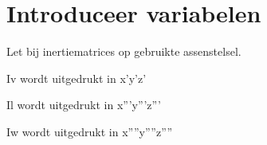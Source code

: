 \documentclass{article}
\begin{document}
\section{\textbf{Introduceer variabelen}}
\begin{maplelatex}\begin{Maple Normal}{
Let bij inertiematrices op gebruikte assenstelsel.}\end{Maple Normal}
\end{maplelatex}
\begin{maplelatex}\begin{Maple Normal}{
Iv wordt uitgedrukt in x'y'z'}\end{Maple Normal}
\end{maplelatex}
\begin{maplelatex}\begin{Maple Normal}{
Il wordt uitgedrukt in x'''y'''z'''}\end{Maple Normal}
\end{maplelatex}
\begin{maplelatex}\begin{Maple Normal}{
Iw wordt uitgedrukt in x''''y''''z''''}\end{Maple Normal}
\end{maplelatex}
\begin{maplelatex}\begin{Maple Normal}{
}\end{Maple Normal}
\end{maplelatex}
\end{document}
